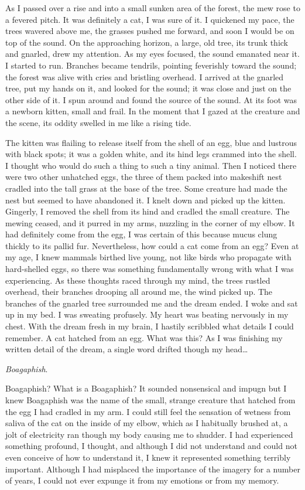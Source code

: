 As I passed over a rise and into a small sunken area of the forest, the
mew rose to a fevered pitch. It was definitely a cat, I was sure of it.
I quickened my pace, the trees wavered above me, the grasses pushed me
forward, and soon I would be on top of the sound. On the approaching
horizon, a large, old tree, its trunk thick and gnarled, drew my
attention. As my eyes focused, the sound emanated near it. I started to
run. Branches became tendrils, pointing feverishly toward the sound; the
forest was alive with cries and bristling overhead. I arrived at the
gnarled tree, put my hands on it, and looked for the sound; it was close
and just on the other side of it. I spun around and found the source of
the sound. At its foot was a newborn kitten, small and frail. In the
moment that I gazed at the creature and the scene, its oddity swelled in
me like a rising tide.

The kitten was flailing to release itself from the shell of an egg, blue
and lustrous with black spots; it was a golden white, and its hind legs
crammed into the shell. I thought who would do such a thing to such a
tiny animal. Then I noticed there were two other unhatched eggs, the
three of them packed into makeshift nest cradled into the tall grass at
the base of the tree. Some creature had made the nest but seemed to have
abandoned it. I knelt down and picked up the kitten. Gingerly, I removed
the shell from its hind and cradled the small creature. The mewing
ceased, and it purred in my arms, nuzzling in the corner of my elbow. It
had definitely come from the egg, I was certain of this because mucus
clung thickly to its pallid fur. Nevertheless, how could a cat come from
an egg? Even at my age, I knew mammals birthed live young, not like
birds who propagate with hard-shelled eggs, so there was something
fundamentally wrong with what I was experiencing. As these thoughts
raced through my mind, the trees rustled overhead, their branches
drooping all around me, the wind picked up. The branches of the gnarled
tree surrounded me and the dream ended. I woke and sat up in my bed. I
was sweating profusely. My heart was beating nervously in my chest. With
the dream fresh in my brain, I hastily scribbled what details I could
remember. A cat hatched from an egg. What was this? As I was finishing
my written detail of the dream, a single word drifted though my
head\ldots{}

\emph{Boagaphish}.

Boagaphish? What is a Boagaphish? It sounded nonsensical and impugn but
I knew Boagaphish was the name of the small, strange creature that
hatched from the egg I had cradled in my arm. I could still feel the
sensation of wetness from saliva of the cat on the inside of my elbow,
which as I habitually brushed at, a jolt of electricity ran though my
body causing me to shudder. I had experienced something profound, I
thought, and although I did not understand and could not even conceive
of how to understand it, I knew it represented something terribly
important. Although I had misplaced the importance of the imagery for a
number of years, I could not ever expunge it from my emotions or from my
memory.


